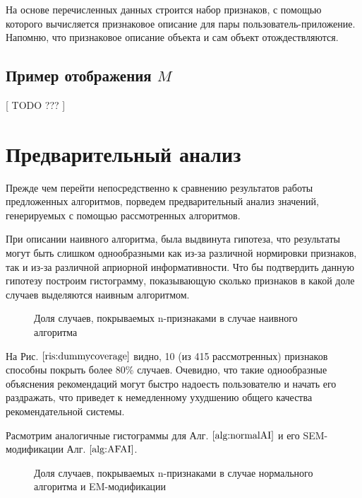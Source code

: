 \documentclass[12pt,a4paper]{report}
\begin{document}
На основе перечисленных данных строится набор признаков, с помощью которого вычисляется признаковое описание для пары пользователь-приложение. Напомню, что признаковое описание объекта и сам объект отождествляются.

\subsection{Пример отображения $M$}
[ TODO ??? ]

\section{Предварительный анализ}
Прежде чем перейти непосредственно к сравнению результатов работы предложенных алгоритмов, порведем предварительный анализ значений, генерируемых с помощью рассмотренных алгоритмов.

При описании наивного алгоритма, была выдвинута гипотеза, что результаты могут быть слишком однообразными как из-за различной нормировки признаков, так и из-за различной априорной информативности. Что бы подтвердить данную гипотезу построим гистограмму, показывающую сколько признаков в какой доле случаев выделяются наивным алгоритмом.

\begin{figure}[H]
\caption{Доля случаев, покрываемых n-признаками в случае наивного алгоритма}
\label{ris:dummycoverage}
\end{figure}

На Рис. $\ref{ris:dummycoverage}$ видно, 10 (из 415 рассмотренных) признаков способны покрыть более 80\% случаев.
Очевидно, что такие однообразные объяснения рекомендаций могут быстро надоесть пользователю и начать его раздражать, что приведет к немедленному ухудшению общего качества рекомендательной системы.

Расмотрим аналогичные гистограммы для Алг. $\ref{alg:normalAI}$ и его SEM-модификации Алг. 
$\ref{alg:AFAI}$.

\begin{figure}[H]
\caption{Доля случаев, покрываемых n-признаками в случае нормального алгоритма и EM-модификации}
\label{ris:normalcoverage}
\end{figure}
\end{document}
